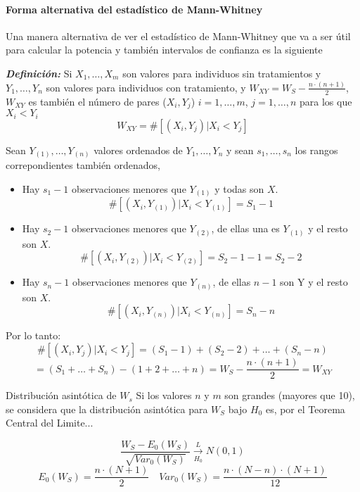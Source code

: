 \paragraph{Forma alternativa del estadístico de Mann-Whitney}

Una manera alternativa de ver el estadístico de Mann-Whitney que va a ser útil para calcular la potencia y también intervalos de confianza es la siguiente

\vspace*{2mm}

\textit{\textbf{Definición: }} Si $X_1,\dots,X_m$ son valores para individuos sin tratamientos y $Y_1,\dots,Y_n$ son valores para individuos con tratamiento,
y $W_{XY}=W_S-\frac{n \cdot (n+1)}{2}$, $W_{XY}$ es también el número de pares ($X_i,Y_j$) $i=1,\dots,m$, $j=1,\dots,n$ para los que $X_i < Y_i$
\[
    W_{XY}= \# [(X_i,Y_j) | X_i <Y_j]
\]

\begin{proofs}
    Sean $Y_{(1)}, \dots, Y_{(n)}$ valores ordenados de $Y_1,\dots,Y_n$ y sean $s_1,\dots,s_n$ los rangos correpondientes también ordenados,
    \begin{itemize}
        \item Hay $s_1-1$ observaciones menores que $Y_{(1)}$ y todas son $X$.
        \[
            \# [(X_i,Y_{(1)}) | X_i <Y_{(1)}]=S_1-1
        \]
        \item Hay $s_2-1$ observaciones menores que $Y_{(2)}$, de ellas una es $Y_{(1)}$ y el resto son $X$.
        \[
            \# [(X_i,Y_{(2)}) | X_i <Y_{(2)}]=S_2-1-1=S_2-2
        \]
        \item Hay $s_n-1$ observaciones menores que $Y_{(n)}$, de ellas $n-1$ son Y y el resto son $X$.
        \[
            \# [(X_i,Y_{(n)}) | X_i <Y_{(n)}]=S_n-n
        \]
    \end{itemize} 
    Por lo tanto:
    \[
        \# [(X_i,Y_j) | X_i <Y_j]=(S_1-1)+(S_2-2)+ \dots +(S_n-n)
    \]
    \[    
        =(S_1+\dots+S_n)-(1+2+\dots+n)=W_S-\frac{n \cdot (n+1)}{2}=W_{XY}
    \]
\end{proofs}

\vspace{5mm}

Distribución asintótica de $W_s$
Si los valores $n$ y $m$ son grandes (mayores que 10), se considera que la distribución asintótica para $W_S$ bajo $H_0$ es, por el Teorema Central del Limite...

\[
    \frac{W_S-E_0(W_S)}{\sqrt{Var_{0}(W_S)}} \xrightarrow[H_0]{L} N(0,1)
\]
\[
    E_0(W_S)=\frac{n \cdot (N+1)}{2} \quad Var_0(W_S)=\frac{n \cdot (N-n) \cdot (N+1)}{12}
\]
